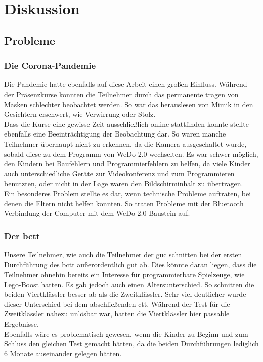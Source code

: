 \chapter{Diskussion}

\section{Probleme}
\subsection{Die Corona-Pandemie}
Die Pandemie hatte ebenfalls auf diese Arbeit einen großen Einfluss. Während der Präsenzkurse konnten die Teilnehmer durch das permanente tragen von Masken schlechter beobachtet werden. So war das herauslesen von Mimik in den Gesichtern erschwert, wie Verwirrung oder Stolz. \\
Dass die Kurse eine gewisse Zeit ausschließlich online stattfinden konnte stellte ebenfalls eine Beeinträchtigung der Beobachtung dar. So waren manche Teilnehmer überhaupt nicht zu erkennen, da die Kamera ausgeschaltet wurde, sobald diese zu dem Programm von WeDo 2.0 wechselten. Es war schwer möglich, den Kindern bei Baufehlern und Programmierfehlern zu helfen, da viele Kinder auch unterschiedliche Geräte zur Videokonferenz und zum Programmieren benutzten, oder nicht in der Lage waren den Bildschirminhalt zu übertragen.\\
Ein besonderes Problem stellte es dar, wenn technische Probleme auftraten, bei denen die Eltern nicht helfen konnten. So traten Probleme mit der Bluetooth Verbindung der Computer mit dem WeDo 2.0 Baustein auf.

\subsection{Der \acrlong{bctt}} \label{problemCTT}
Unsere Teilnehmer, wie auch die Teilnehmer der \acrlong{guc} schnitten bei der ersten Durchführung des \acrshort{bctt} außerordentlich gut ab. Dies könnte daran liegen, dass die Teilnehmer ohnehin bereits ein Interesse für programmierbare Spielzeuge, wie \gls{Lego}-Boost hatten. Es gab jedoch auch einen Altersunterschied. So schnitten die beiden Viertklässler besser ab als die Zweitklässler. Sehr viel deutlicher wurde dieser Unterschied bei dem abschließenden \acrshort{ctt}. Während der Test für die Zweitklässler nahezu unlösbar war, hatten die Viertklässler hier passable Ergebnisse.\\
Ebenfalls wäre es problematisch gewesen, wenn die Kinder zu Beginn und zum Schluss den gleichen Test gemacht hätten, da die beiden Durchführungen lediglich 6 Monate auseinander gelegen hätten.

